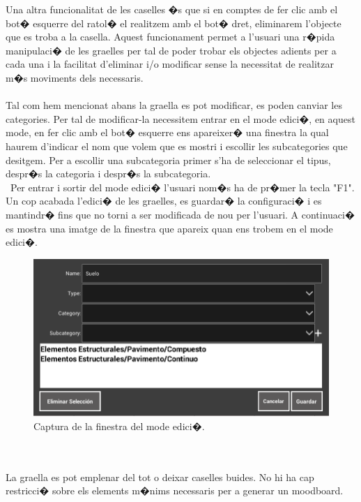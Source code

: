 \documentclass[12pt,a4paper,openright,oneside]{article}
\numberwithin{equation}{section}
\theoremstyle{definition}
\begin{document}
Una altra funcionalitat de les caselles �s que si en comptes de fer clic amb el bot� esquerre del ratol� el realitzem amb el bot� dret, eliminarem l'objecte que es troba a la casella. Aquest funcionament permet a l'usuari una r�pida manipulaci� de les graelles per tal de poder trobar els objectes adients per a cada una i la facilitat d'eliminar i/o modificar sense la necessitat de realitzar m�s moviments dels necessaris. \\\\
Tal com hem mencionat abans la graella es pot modificar, es poden canviar les categories. Per tal de modificar-la necessitem entrar en el mode edici�, en aquest mode, en fer clic amb el bot� esquerre ens apareixer� una finestra la qual haurem d'indicar el nom que volem que es mostri i escollir les subcategories que desitgem. Per a escollir una subcategoria primer s'ha de seleccionar el tipus, despr�s la categoria i despr�s la subcategoria. \\\
Per entrar i sortir del mode edici� l'usuari nom�s ha de pr�mer la tecla "F1". Un cop acabada l'edici� de les graelles, es guardar� la configuraci� i es mantindr� fins que no torni a ser modificada de nou per l'usuari. A continuaci� es mostra una imatge de la finestra que apareix quan ens trobem en el mode edici�.
\begin{figure}[h!]
\begin{center}
\includegraphics[width=\textwidth]{edit}
\caption{Captura de la finestra del mode edici�.}
\end{center}
\end{figure}
\\\\
La graella es pot emplenar del tot o deixar caselles buides. No hi ha cap restricci� sobre els elements m�nims necessaris per a generar un moodboard.
\\\\
\end{document}
